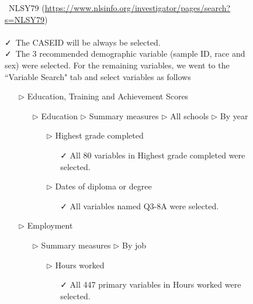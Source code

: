 \documentclass{article}
\begin{document}
\begin{figure}[p]

\begin{tcolorbox}[title = Navigating the data source, fontupper=\linespread{.8}\selectfont]
\vspace{3mm}
\faDatabase\ NLSY79 (\url{https://www.nlsinfo.org/investigator/pages/search?s=NLSY79})\\\\
\vspace{3mm}
\faCheck\ The CASEID will be always be selected.  \\
\vspace{1mm}
\faCheck\ The 3 recommended demographic variable (sample ID, race and sex) were selected.  For the remaining variables, we went to the ``Variable Search" tab and select variables as follows
\begin{itemize}
\item[$\triangleright$] Education, Training and Achievement Scores
\begin{itemize}
\item[$\triangleright$] Education $\triangleright$ Summary measures $\triangleright$ All schools $\triangleright$ By year
\begin{itemize}
\item[$\triangleright$] Highest grade completed
\begin{itemize}
\item[\faCheck] All 80 variables in Highest grade completed were selected.
\end{itemize}
\end{itemize}
\begin{itemize}
\item[$\triangleright$] Dates of diploma or degree
\begin{itemize}
\item[\faCheck] All variables named Q3-8A were selected.
\end{itemize}
\end{itemize}
\end{itemize}
\item[$\triangleright$] Employment
\begin{itemize}
\item[$\triangleright$] Summary measures $\triangleright$ By job
\begin{itemize}
\item[$\triangleright$] Hours worked  
\begin{itemize}
\item[\faCheck] All 447 primary variables in Hours worked were selected.

\end{itemize}
\end{itemize}
\end{itemize}
\end{itemize}
\end{tcolorbox}
\end{figure}
\end{document}

